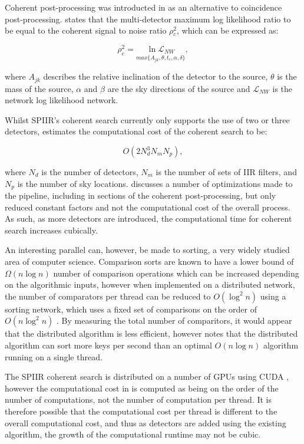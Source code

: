 \documentclass{article}
\begin{document}
Coherent post-processing was introducted in \cite{ChuThesis} as an alternative to coincidence
post-processing. \cite{ChuThesis} states that the multi-detector maximum log likelihood ratio to be
equal to the coherent signal to noise ratio \(\rho{}^2_c\), which can be expressed as:

\begin{equation}
    \rho^2_c = \underset{max\{A_{jk},\theta,t_{c},\alpha,\delta\}}{\ln \mathcal{L}_{NW}},
\end{equation}

where \(A_{jk}\) describes the relative inclination of the detector to the source, \(\theta\) is the
mass of the source, \(\alpha\) and \(\beta\) are the sky directions of the source and
\(\mathcal{L}_{NW}\) is the network log likelihood network.

Whilst SPIIR's coherent search currently only supports the use of two or three detectors,
\cite{ChuThesis} estimates the computational cost of the coherent search to be:

\begin{equation}
    O(2N^3_dN_mN_p),
\end{equation}

where \(N_d\) is the number of detectors, \(N_m\) is the number of sets of IIR filters, and \(N_p\)
is the number of sky locations. \cite{SPIIRGPU2018} discusses a number of optimizations made to the
pipeline, including in sections of the coherent post-processing, but only reduced constant factors
and not the computational cost of the overall process. As such, as more detectors are introduced,
the computational time for coherent search increases cubically.

An interesting parallel can, however, be made to sorting, a very widely studied area of computer
science. Comparison sorts are known to have a lower bound of \(\Omega{}(n\log{n})\) number of
comparison operations \cite{CLRS} which can be increased depending on the algorithmic inputs,
however when implemented on a distributed network, the number of comparators per thread can be
reduced to \(O(\log^2{n})\) using a sorting network, which uses a fixed set of comparisons on the
order of \(O(n\log^2{n})\) \cite{nvidia}. By measuring the total number of comparitors, it would
appear that the distributed algorithm is less efficient, however \cite{nvidia} notes that the
distributed algorithm can sort more keys per second than an optimal \(O(n\log{n})\) algorithm
running on a single thread.

The SPIIR coherent search is distributed on a number of GPUs using CUDA \cite{SPIIRGPU2018}, however
the computational cost in \cite{ChuThesis} is computed as being on the order of the number of
computations, not the number of computation per thread. It is therefore possible that the
computational cost per thread is different to the overall computational cost, and thus as detectors
are added using the existing algorithm, the growth of the computational runtime may not be cubic.
\end{document}
